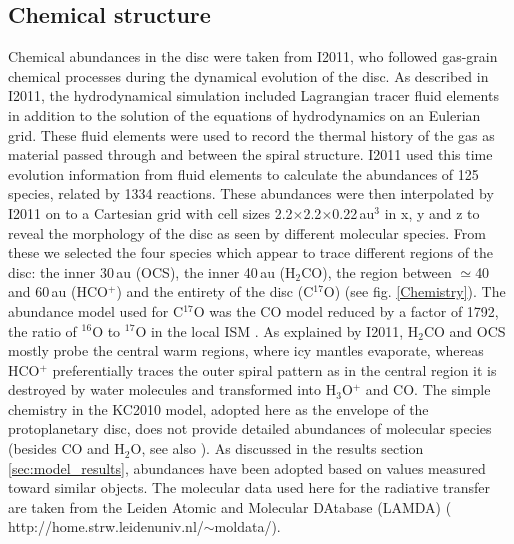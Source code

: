 \documentclass[useAMS,usenatbib]{mn2e}
\begin{document}
\subsection{Chemical structure} \label{subsec:chemical_structure}
Chemical abundances in the disc were taken from I2011, who followed gas-grain chemical processes during the dynamical evolution of the disc. As described in I2011, the hydrodynamical simulation included Lagrangian tracer fluid elements in addition to the solution of the equations of hydrodynamics on an Eulerian grid.  These fluid elements were used to record the thermal history of the gas as material passed through and between the spiral structure. I2011 used this time evolution information from fluid elements to calculate the abundances of 125 species, related by 1334 reactions.  These abundances were then interpolated by I2011 on to a Cartesian grid with cell sizes 2.2$\times$2.2$\times$0.22$\,$au$^3$ in x, y and z to reveal the morphology of the disc as seen by different molecular species. From these we selected the four species which appear to trace different regions of the disc: the inner 30\,au (OCS), the inner 40\,au (H$_2$CO),  the region between $\simeq$40 and 60\,au (HCO$^+$) and the entirety of the disc (C$^{17}$O) (see fig. \ref{Chemistry}). The abundance model used for C$^{17}$O was the CO model reduced by a factor of 1792, the ratio of $^{16}$O to $^{17}$O in the local ISM \citep{Wilson1994}. As explained by I2011,  H$_2$CO and OCS mostly probe the central warm regions, where icy mantles evaporate, whereas HCO$^+$ preferentially traces the outer spiral pattern as in the central region it is destroyed by water molecules and transformed into H$_3$O$^+$ and CO. The simple chemistry in the KC2010 model, adopted here as the envelope of the protoplanetary disc, does not provide detailed abundances of molecular species (besides CO and H$_2$O, see also \citealt{Caselli2012}). As discussed in the results section \ref{sec:model_results}, abundances have been adopted based on values measured toward similar objects. The molecular data used here for the radiative transfer are taken from the Leiden Atomic and Molecular DAtabase (LAMDA) (\citealt{Schoier2005} http://home.strw.leidenuniv.nl/$\sim$moldata/).
\end{document}
